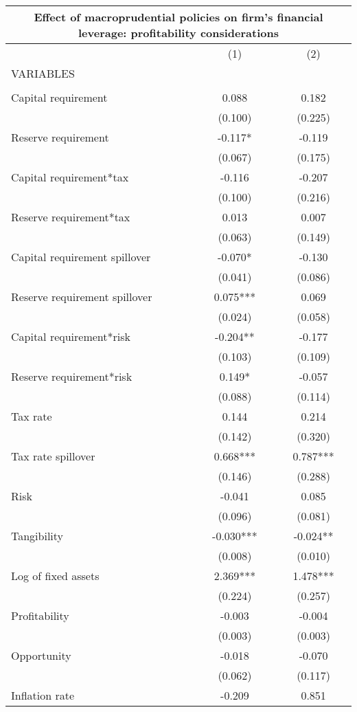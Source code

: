 \begin{tabular}{lcc}
\multicolumn{3}{c}{Effect of macroprudential policies on firm's financial leverage: profitability considerations} \\ \hline
 & (1) & (2) \\
VARIABLES &  &  \\ \hline
 &  &  \\
Capital requirement & 0.088 & 0.182 \\
 & (0.100) & (0.225) \\
Reserve requirement & -0.117* & -0.119 \\
 & (0.067) & (0.175) \\
Capital requirement*tax & -0.116 & -0.207 \\
 & (0.100) & (0.216) \\
Reserve requirement*tax & 0.013 & 0.007 \\
 & (0.063) & (0.149) \\
Capital requirement spillover & -0.070* & -0.130 \\
 & (0.041) & (0.086) \\
Reserve requirement spillover & 0.075*** & 0.069 \\
 & (0.024) & (0.058) \\
Capital requirement*risk & -0.204** & -0.177 \\
 & (0.103) & (0.109) \\
Reserve requirement*risk & 0.149* & -0.057 \\
 & (0.088) & (0.114) \\
Tax rate & 0.144 & 0.214 \\
 & (0.142) & (0.320) \\
Tax rate spillover & 0.668*** & 0.787*** \\
 & (0.146) & (0.288) \\
Risk & -0.041 & 0.085 \\
 & (0.096) & (0.081) \\
Tangibility & -0.030*** & -0.024** \\
 & (0.008) & (0.010) \\
Log of fixed assets & 2.369*** & 1.478*** \\
 & (0.224) & (0.257) \\
Profitability & -0.003 & -0.004 \\
 & (0.003) & (0.003) \\
Opportunity & -0.018 & -0.070 \\
 & (0.062) & (0.117) \\
Inflation rate & -0.209 & 0.851 \\

\end{tabular}
